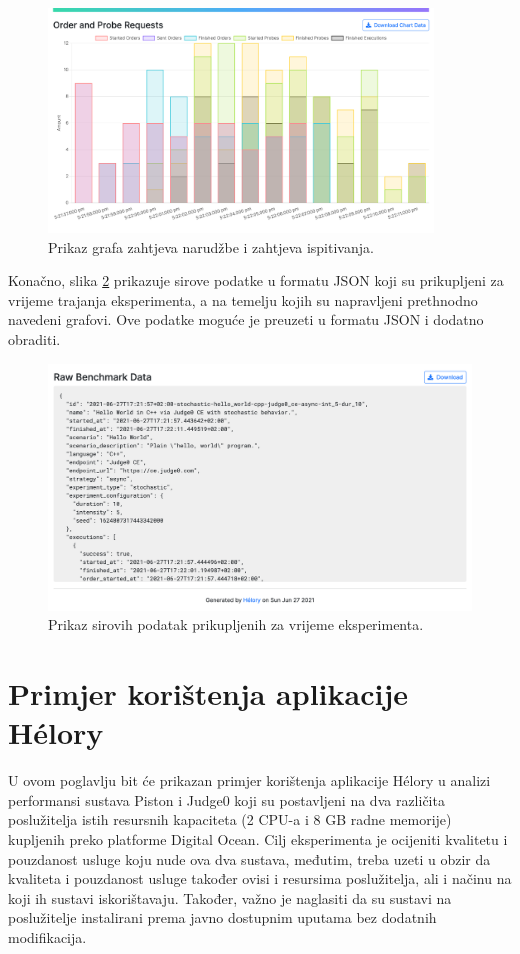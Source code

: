 \documentclass[times, utf8, diplomski]{fer}
\begin{document}
\begin{figure}[htb]
	\centering
	\includegraphics[width=0.91\textwidth]{images/Report UI 3.png}
	\caption{
		Prikaz grafa zahtjeva narudžbe i zahtjeva ispitivanja.
	}
	\label{fig:report-requests}
\end{figure}

\pagebreak

Konačno, slika \ref{fig:report-raw-data} prikazuje sirove podatke u formatu JSON koji su prikupljeni za vrijeme trajanja eksperimenta, a na temelju kojih su napravljeni prethnodno navedeni grafovi. Ove podatke moguće je preuzeti u formatu JSON i dodatno obraditi.

\begin{figure}[htb]
	\centering
	\includegraphics[width=\textwidth]{images/Report UI 4.png}
	\caption{
		Prikaz sirovih podatak prikupljenih za vrijeme eksperimenta.
	}
	\label{fig:report-raw-data}
\end{figure}

\chapter{Primjer korištenja aplikacije Hélory}
\label{chap:use}
U ovom poglavlju bit će prikazan primjer korištenja aplikacije Hélory u analizi performansi sustava Piston i Judge0 koji su postavljeni na dva različita poslužitelja istih resursnih kapaciteta (2 CPU-a i 8 GB radne memorije) kupljenih preko platforme Digital Ocean. Cilj eksperimenta je ocijeniti kvalitetu i pouzdanost usluge koju nude ova dva sustava, međutim, treba uzeti u obzir da kvaliteta i pouzdanost usluge također ovisi i resursima poslužitelja, ali i načinu na koji ih sustavi iskorištavaju. Također, važno je naglasiti da su sustavi na poslužitelje instalirani prema javno dostupnim uputama bez dodatnih modifikacija.
\end{document}
